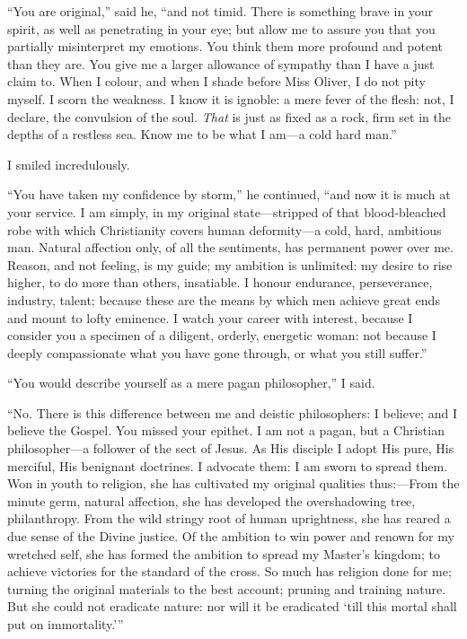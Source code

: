 \enquote{You are original,} said he, \enquote{and not timid. There is
	something brave in your spirit, as well as penetrating in your eye; but
	allow me to assure you that you partially misinterpret my emotions. You
	think them more profound and potent than they are. You give me a larger
	allowance of sympathy than I have a just claim to. When I colour, and
	when I shade before Miss Oliver, I do not pity myself. I scorn the
	weakness. I know it is ignoble: a mere fever of the flesh: not, I
	declare, the convulsion of the soul. \emph{That} is just as fixed as a
	rock, firm set in the depths of a restless sea. Know me to be what I
	am---a cold hard man.}

I smiled incredulously.

\enquote{You have taken my confidence by storm,} he continued,
\enquote{and now it is much at your service. I am simply, in my
	original state---stripped of that blood-bleached robe with which
	Christianity covers human deformity---a cold, hard, ambitious man.
	Natural affection only, of all the sentiments, has permanent power over
	me. Reason, and not feeling, is my guide; my ambition is unlimited: my
	desire to rise higher, to do more than others, insatiable. I honour
	endurance, perseverance, industry, talent; because these are the means
	by which men achieve great ends and mount to lofty eminence. I watch
	your career with interest, because I consider you a specimen of a
	diligent, orderly, energetic woman: not because I deeply compassionate
	what you have gone through, or what you still suffer.}

\enquote{You would describe yourself as a mere pagan philosopher,} I
said.

\enquote{No. There is this difference between me and deistic
	philosophers: I believe; and I believe the Gospel. You missed your
	epithet. I am not a pagan, but a Christian philosopher---a follower of
	the sect of Jesus. As His disciple I adopt His pure, His merciful, His
	benignant doctrines. I advocate them: I am sworn to spread them. Won
	in youth to religion, she has cultivated my original qualities
	thus:---From the minute germ, natural affection, she has developed the
	overshadowing tree, philanthropy. From the wild stringy root of human
	uprightness, she has reared a due sense of the Divine justice. Of the
	ambition to win power and renown for my wretched self, she has formed
	the ambition to spread my Master's kingdom; to achieve victories for the
	standard of the cross. So much has religion done for me; turning the
	original materials to the best account; pruning and training nature.
	But she could not eradicate nature: nor will it be eradicated
	\enquote{till this mortal shall put on immortality.}}


